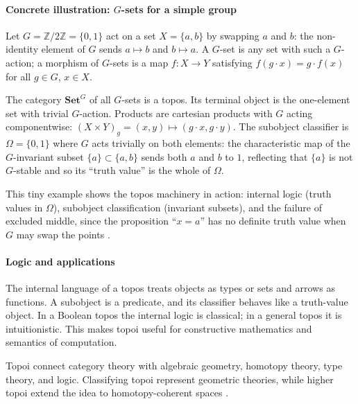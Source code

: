 \paragraph{Concrete illustration: $G$-sets for a simple group}
Let $G=\mathbb{Z}/2\mathbb{Z}=\{0,1\}$ act on a set $X=\{a,b\}$ by swapping $a$ and $b$: the non-identity element of $G$ sends $a\mapsto b$ and $b\mapsto a$. A $G$-set is any set with such a $G$-action; a morphism of $G$-sets is a map $f\colon X\to Y$ satisfying $f(g\cdot x)=g\cdot f(x)$ for all $g\in G$, $x\in X$.

The category $\mathbf{Set}^{G}$ of all $G$-sets is a topos. Its terminal object is the one-element set with trivial $G$-action. Products are cartesian products with $G$ acting componentwise: $(X\times Y)_g=(x,y)\mapsto(g\cdot x,g\cdot y)$. The subobject classifier is $\Omega=\{0,1\}$ where $G$ acts trivially on both elements: the characteristic map of the $G$-invariant subset $\{a\}\subset\{a,b\}$ sends both $a$ and $b$ to $1$, reflecting that $\{a\}$ is not $G$-stable and so its ``truth value'' is the whole of $\Omega$.

This tiny example shows the topos machinery in action: internal logic (truth values in $\Omega$), subobject classification (invariant subsets), and the failure of excluded middle, since the proposition ``$x=a$'' has no definite truth value when $G$ may swap the points \cite{topos_ref1,topos_ref2}.

\paragraph{Logic and applications}
The internal language of a topos treats objects as types or sets and arrows as functions. A subobject is a predicate, and its classifier behaves like a truth-value object. In a Boolean topos the internal logic is classical; in a general topos it is intuitionistic. This makes topoi useful for constructive mathematics and semantics of computation.

Topoi connect category theory with algebraic geometry, homotopy theory, type theory, and logic. Classifying topoi represent geometric theories, while higher topoi extend the idea to homotopy-coherent spaces \cite{topos_ref3}.

